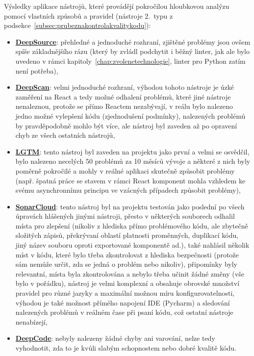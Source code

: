 Výsledky aplikace nástrojů, které provádějí pokročilou hloubkovou analýzu pomocí vlastních způsobů a pravidel (nástroje 2.~typu z podsekce~\ref{subsec:prubeznakontrolakvalitykodu}):
\begin{itemize}
    \item \href{https://deepsource.io/}{\textbf{DeepSource}}: přehledné a jednoduché rozhraní, zjištěné problémy jsou ovšem spíše základnějšího rázu (který by zvládl podchytit i běžný linter, jak ale bylo uvedeno v rámci kapitoly~\ref{chap:zvolenetechnologie}, linter pro Python zatím není potřeba),
    \item \href{https://deepscan.io}{\textbf{DeepScan}}: velmi jednoduché rozhraní, výhodou tohoto nástroje je úzké zaměření na React a tedy možné odhalení problémů, které jiné nástroje nenaleznou, protože se přímo Reactem nezabývají, v reálu bylo nalezeno jedno možné vylepšení kódu (zjednodušení podmínky), nalezených problémů by pravděpodobně mohlo být více, ale nástroj byl zaveden až po opravení chyb ze všech ostatních nástrojů,
    \item \href{https://lgtm.com}{\textbf{LGTM}}: tento nástroj byl zaveden na projektu jako první a velmi se osvědčil, bylo nalezeno necelých 50 problémů za 10 měsíců vývoje a některé z nich byly poměrně pokročilé a mohly v reálné aplikaci skutečně způsobit problémy (např. špatná práce se stavem v rámci React komponent mohla vzhledem ke svému asynchronnímu principu ve vzácných případech způsobit problémy),
    \item \href{https://sonarcloud.io/}{\textbf{SonarCloud}}: tento nástroj byl na projektu testován jako poslední po všech úpravách hlášených jinými nástroji, přesto v některých souborech odhalil místa pro zlepšení (nikoliv z hlediska přímo problémového kódu, ale zbytečně složitých zápisů, překrývaní oblastí platnosti proměnných, duplikací kódu, jiný název souboru oproti exportované komponentě ad.), také nahlásil několik míst v kódu, které bylo třeba zkontrolovat z hlediska bezpečnosti (protože sám nemůže určit, zda se jedná o problém nebo nikoliv), připomínky byly relevantní, místa byla zkontrolována a nebylo třeba učinit žádné změny (vše bylo v pořádku), nástroj je velmi komplexní a obsahuje obrovské množství pravidel pro různé jazyky a maximální možnou míru konfigurovatelnosti, výhodou je také možnost přímého napojení IDE (Pycharm) a sledování nalezených problémů v reálném čase při psaní kódu, což ostatní nástroje nenabízejí,
    \item \href{https://www.deepcode.ai/}{\textbf{DeepCode}}: nebyly nalezeny žádné chyby ani varování, nelze tedy vyhodnotit, zda to je kvůli slabým schopnostem nebo dobré kvalitě kódu.
\end{itemize}

